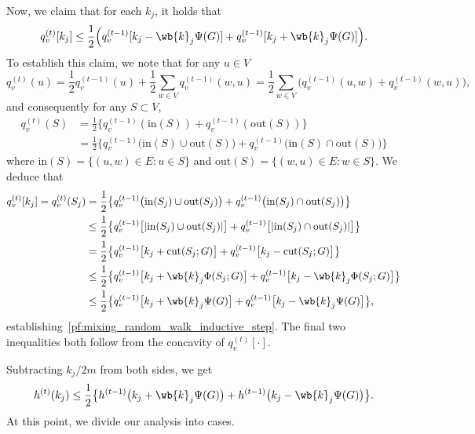 	Now, we claim that for each $k_j$, it holds that
	\begin{equation}
	\label{pf:mixing_random_walk_inductive_step}
	q_v^{(t)}[k_j] \leq \frac{1}{2}\Bigl(q_v^{(t - 1)}[k_j - \wb{k}_j \Psi(G)] + q_v^{(t - 1)}[k_j + \wb{k}_j \Psi(G)]\Bigr).
	\end{equation}
	To establish this claim, we note that for any $u \in V$
	\begin{equation*}
	q_v^{(t)}(u) = \frac{1}{2}q_v^{(t - 1)}(u) + \frac{1}{2}\sum_{w \in V}q_v^{(t - 1)}(w,u) = \frac{1}{2} \sum_{w \in V} \bigl(q_v^{(t - 1)}(u,w) + q_v^{(t - 1)}(w,u)\bigr),
	\end{equation*}
	and consequently for any $S \subset V$,
	\begin{align*}
	q_v^{(t)}(S) & = \frac{1}{2}\bigl\{q_v^{(t - 1)}(\mathrm{in}(S)) +  q_v^{(t - 1)}(\mathrm{out}(S))\bigr\} \\
	& = \frac{1}{2}\bigl\{q_v^{(t - 1)}\bigl(\mathrm{in}(S) \cup \mathrm{out}(S)\bigr) +  q_v^{(t - 1)}\bigl(\mathrm{in}(S) \cap \mathrm{out}(S)\bigr)\bigr\}
	\end{align*}
	where $\mathrm{in}(S) = \{(u,w) \in E: u \in S\}$ and $\mathrm{out}(S) = \{(w,u) \in E: w \in S\}$. We deduce that
	\begin{align*}
	q_v^{(t)}[k_j] = q_v^{(t)}(S_j) & = \frac{1}{2}\bigl\{q_v^{(t - 1)}\bigl(\mathrm{in}(S_j) \cup \mathrm{out}(S_j)\bigr) +  q_v^{(t - 1)}\bigl(\mathrm{in}(S_j) \cap \mathrm{out}(S_j)\bigr)\bigr\} \\
	& \leq \frac{1}{2}\bigl\{q_v^{(t - 1)}\bigl[|\mathrm{in}(S_j) \cup \mathrm{out}(S_j)|\bigr] +  q_v^{(t - 1)}\bigl[|\mathrm{in}(S_j) \cap \mathrm{out}(S_j)|\bigr]\bigr\} \\
	& = \frac{1}{2}\bigl\{q_v^{(t - 1)}\bigl[k_j + \mathrm{cut}(S_j;G)\bigr] +  q_v^{(t - 1)}\bigl[k_j - \mathrm{cut}(S_j;G)\bigr]\bigr\} \\
	& \leq \frac{1}{2}\bigl\{q_v^{(t - 1)}\bigl[k_j + \wb{k}_j\Phi(S_j;G)\bigr] +  q_v^{(t - 1)}\bigl[k_j - \wb{k}_j\Phi(S_j;G)\bigr]\bigr\} \\
	& \leq \frac{1}{2}\bigl\{q_v^{(t - 1)}\bigl[k_j + \wb{k}_j\Psi(G)\bigr] +  q_v^{(t - 1)}\bigl[k_j - \wb{k}_j\Psi(G)\bigr]\bigr\},
	\end{align*}
	establishing~\eqref{pf:mixing_random_walk_inductive_step}. The final two inequalities both follow from the concavity of $q_v^{(t)}[\cdot]$. 
	
	Subtracting $k_j/2m$ from both sides, we get
	\begin{equation}
	\label{pf:mixing_random_walk_inductive_step_h}
	h^{(t)}(k_j) \leq \frac{1}{2}\bigl\{h^{(t - 1)}\bigl(k_j + \wb{k}_j\Psi(G)\bigr)+  h^{(t - 1)}\bigl(k_j - \wb{k}_j\Psi(G)\bigr)\bigr\}.
	\end{equation}
	At this point, we divide our analysis into cases.
	
